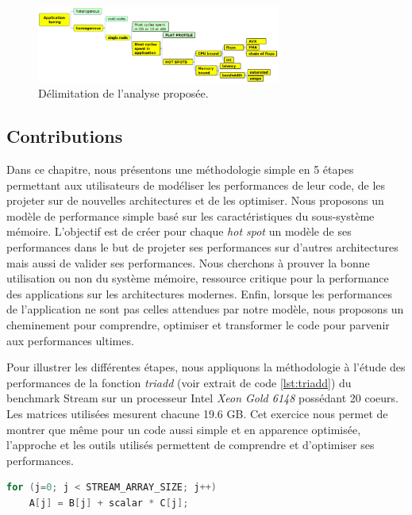 \begin{figure}
    \center
    \includegraphics[width=8cm]{images/analyse.png}
    \caption{\label{pic_analyse} Délimitation de l'analyse proposée.}
\end{figure}



\subsection{Contributions}
Dans ce chapitre, nous présentons une méthodologie simple en 5 étapes permettant aux utilisateurs de modéliser les performances de leur code, de les projeter sur de nouvelles architectures et de les optimiser. Nous proposons un modèle de performance simple basé sur les caractéristiques du sous-système mémoire. L'objectif est de créer pour chaque \textit{hot spot} un modèle de ses performances dans le but de projeter ses performances sur d'autres architectures mais aussi de valider ses performances. Nous cherchons à prouver la bonne utilisation ou non du système mémoire, ressource critique pour la performance des applications sur les architectures modernes. Enfin, lorsque les performances de l'application ne sont pas celles attendues par notre modèle, nous proposons un cheminement pour comprendre, optimiser et transformer le code pour parvenir aux performances ultimes.

Pour illustrer les différentes étapes, nous appliquons la méthodologie à l'étude des performances de la fonction \textit{triadd} (voir extrait de code \ref{lst:triadd}) du benchmark Stream \cite{McCalpin1995} sur un processeur Intel\textit{ Xeon Gold 6148} possédant 20 coeurs. Les matrices utilisées mesurent chacune 19.6 GB. Cet exercice nous permet de montrer que même pour un code aussi simple et en apparence optimisée, l'approche et les outils utilisés permettent de comprendre et d'optimiser ses performances.

\begin{lstlisting}[language=c,caption=Fonction Triadd extraite du benchmark Stream \ref{McCalpin1995},label={lst:triadd}, 
  basicstyle=\footnotesize, frame=tb,
  xleftmargin=.065\textwidth, xrightmargin=.065\textwidth]
for (j=0; j < STREAM_ARRAY_SIZE; j++)
    A[j] = B[j] + scalar * C[j];
\end{lstlisting}



